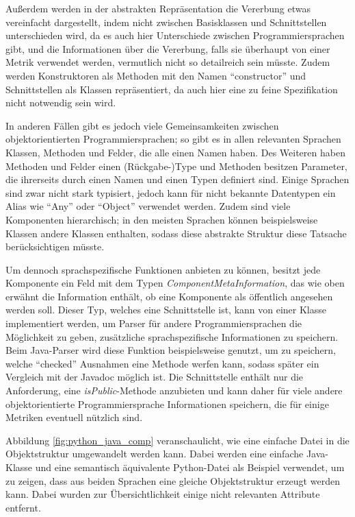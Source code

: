 Außerdem werden in der abstrakten Repräsentation die Vererbung etwas vereinfacht dargestellt, indem nicht zwischen Basisklassen und Schnittstellen unterschieden wird, da es auch hier Unterschiede zwischen Programmiersprachen gibt, und die Informationen über die Vererbung, falls sie überhaupt von einer Metrik verwendet werden, vermutlich nicht so detailreich sein müsste. Zudem werden Konstruktoren als Methoden mit den Namen \enquote{constructor} und Schnittstellen als Klassen repräsentiert, da auch hier eine zu feine Spezifikation nicht notwendig sein wird.  

  

In anderen Fällen gibt es jedoch viele Gemeinsamkeiten zwischen objektorientierten Programmiersprachen; so gibt es in  allen relevanten Sprachen Klassen, Methoden und Felder, die alle einen Namen haben. Des Weiteren haben Methoden und Felder einen (Rückgabe-)Type und Methoden besitzen Parameter, die ihrerseits durch einen Namen und einen Typen definiert sind. Einige Sprachen sind zwar nicht stark typisiert, jedoch kann für nicht bekannte Datentypen ein Alias wie \enquote{Any} oder  \enquote{Object} verwendet werden.  Zudem sind viele Komponenten hierarchisch; in den meisten Sprachen können beispielsweise Klassen andere Klassen enthalten, sodass diese abstrakte Struktur diese Tatsache berücksichtigen müsste. 

Um dennoch sprachspezifische Funktionen anbieten zu können, besitzt jede Komponente ein Feld mit dem Typen \textit{ComponentMetaInformation}, das wie oben erwähnt die Information enthält, ob eine Komponente als öffentlich angesehen werden soll. Dieser Typ, welches eine Schnittstelle ist, kann von einer Klasse implementiert werden, um Parser für andere Programmiersprachen die Möglichkeit zu geben, zusätzliche sprachspezifische Informationen zu speichern. Beim Java-Parser wird diese Funktion beispielsweise genutzt, um zu speichern, welche \enquote{checked} Ausnahmen eine Methode werfen kann, sodass später ein Vergleich mit der Javadoc möglich ist. Die Schnittstelle enthält nur die Anforderung, eine \textit{isPublic}-Methode anzubieten und kann daher für viele andere objektorientierte Programmiersprache Informationen speichern, die für einige Metriken eventuell nützlich sind. 





Abbildung \ref{fig:python_java_comp} veranschaulicht, wie eine einfache Datei in die Objektstruktur umgewandelt werden kann. Dabei werden eine einfache Java-Klasse und eine semantisch äquivalente Python-Datei als Beispiel verwendet, um zu zeigen, dass aus beiden Sprachen eine gleiche Objektstruktur erzeugt werden kann. Dabei wurden zur Übersichtlichkeit einige nicht relevanten Attribute entfernt.



